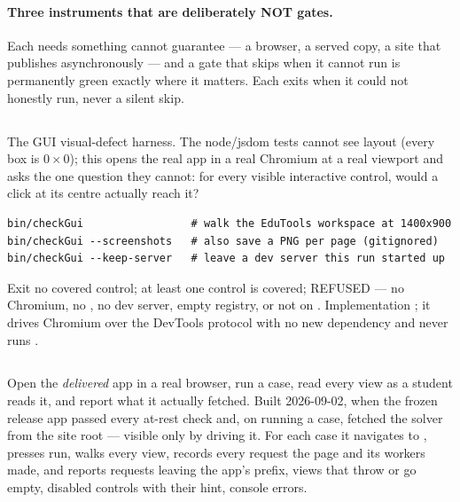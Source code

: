 \documentclass[11pt,a4paper]{article}
\begin{document}
\paragraph{Three instruments that are deliberately NOT gates.}  Each
needs something  cannot guarantee --- a browser, a
served copy, a site that publishes asynchronously --- and a gate that
skips when it cannot run is permanently green exactly where it matters.
Each exits  when it could not honestly run, never a silent skip.

\subsection{}\label{sec:tool-checkgui}

The GUI visual-defect harness.  The node/jsdom tests cannot see layout
(every box is $0\times0$); this opens the real app in a real Chromium at
a real viewport and asks the one question they cannot: for every visible
interactive control, would a click at its centre actually reach it?

\begin{lstlisting}
bin/checkGui                 # walk the EduTools workspace at 1400x900
bin/checkGui --screenshots   # also save a PNG per page (gitignored)
bin/checkGui --keep-server   # leave a dev server this run started up
\end{lstlisting}

Exit  no covered control;  at least one control is
covered;  REFUSED --- no Chromium, no , no
dev server, empty registry, or  not on .
Implementation ; it drives Chromium over the
DevTools protocol with no new dependency and never runs
.

\subsection{}\label{sec:tool-driveapp}

Open the \emph{delivered} app in a real browser, run a case, read every
view as a student reads it, and report what it actually fetched.  Built
2026-09-02, when the frozen release app passed every at-rest check and,
on running a case, fetched the solver from the site root --- visible only
by driving it.  For each case it navigates to ,
presses run, walks every view, records every request the page and its
workers made, and reports requests leaving the app's prefix, views that
throw or go empty, disabled controls with their hint, console errors.
\end{document}
